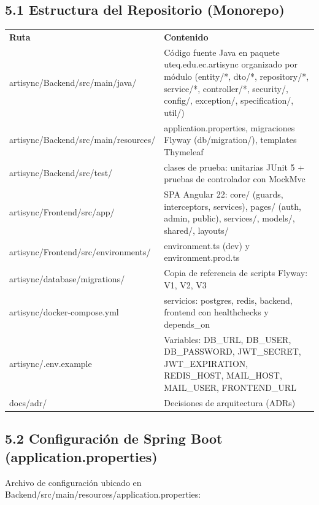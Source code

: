\documentclass[
]{article}
\begin{document}
\subsection{5.1 Estructura del Repositorio
(Monorepo)}

\begin{longtable}[]{@{}
  >{\raggedright\arraybackslash}p{}
  >{\raggedright\arraybackslash}p{}@{}}
\toprule\noalign{}
\endhead
\bottomrule\noalign{}
\endlastfoot
\textbf{Ruta} & \textbf{Contenido} \\
artisync/Backend/src/main/java/ & Código fuente Java en paquete
uteq.edu.ec.artisync organizado por módulo (entity/*, dto/*,
repository/*, service/*, controller/*, security/, config/, exception/,
specification/, util/) \\
artisync/Backend/src/main/resources/ & application.properties,
migraciones Flyway (db/migration/), templates Thymeleaf \\
artisync/Backend/src/test/ & 16 clases de prueba: unitarias JUnit 5 +
pruebas de controlador con MockMvc \\
artisync/Frontend/src/app/ & SPA Angular 22: core/ (guards,
interceptors, services), pages/ (auth, admin, public), services/,
models/, shared/, layouts/ \\
artisync/Frontend/src/environments/ & environment.ts (dev) y
environment.prod.ts \\
artisync/database/migrations/ & Copia de referencia de scripts Flyway:
V1, V2, V3 \\
artisync/docker-compose.yml & 4 servicios: postgres, redis, backend,
frontend con healthchecks y depends\_on \\
artisync/.env.example & Variables: DB\_URL, DB\_USER, DB\_PASSWORD,
JWT\_SECRET, JWT\_EXPIRATION, REDIS\_HOST, MAIL\_HOST, MAIL\_USER,
FRONTEND\_URL \\
docs/adr/ & Decisiones de arquitectura (ADRs) \\
\end{longtable}

\subsection{5.2 Configuración de Spring Boot
(application.properties)}

Archivo de configuración ubicado en
Backend/src/main/resources/application.properties:
\end{document}
